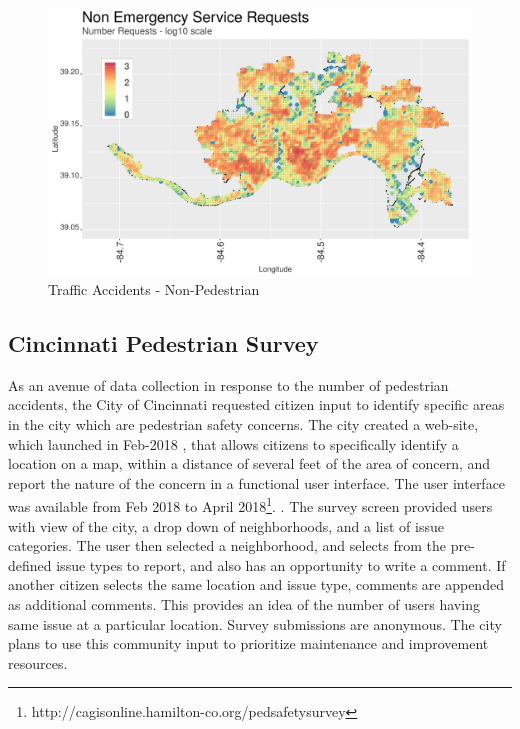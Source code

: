 \documentclass{llncs}
\begin{document}
\FloatBarrier
\begin{figure}
 	\includegraphics[width=\textwidth, height=\textheight, keepaspectratio]{nonEmergencyNumRequests}
 	\caption{Traffic Accidents - Non-Pedestrian}
	\label{figure : nonEmergencyNumRequests}
\end{figure}
\FloatBarrier


\subsection{Cincinnati Pedestrian Survey}

As an avenue of data collection in response to the number of pedestrian accidents, the City of Cincinnati requested citizen input to identify specific areas in the city which are pedestrian safety concerns. The city created a web-site, which launched in Feb-2018 \cite{cvg2018city}, that allows citizens to specifically identify a location on a map, within a distance of several feet of the area of concern, and report the nature of the concern in a functional user interface. The user interface was available from Feb 2018 to April 2018\footnote{http://cagisonline.hamilton-co.org/pedsafetysurvey}. \cite{cvg2018city}. The survey screen provided users with view of the city, a drop down of neighborhoods, and a list of issue categories. The user then selected a neighborhood, and selects from the pre-defined issue types to report, and also has an opportunity to write a comment. If another citizen selects the same location and issue type, comments are appended as additional comments. This provides an idea of the number of users having same issue at a particular location. Survey submissions are anonymous. The city plans to use this community input to prioritize maintenance and improvement resources.
\end{document}
